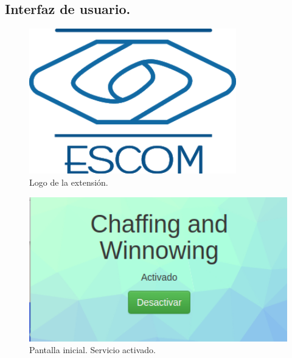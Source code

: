 \documentclass[12pt, a4paper, titlepage]{report}
\begin{document}
			    
			\subsection{Interfaz de usuario.}
			    
			    \begin{figure}[H]
					\begin{center}	\includegraphics[width=9cm]{./imagenes/Desarrollo/Prototipo_1/escom.png}
						\caption{Logo de la extensión.}
					\end{center}
				\end{figure}
			  
			    \begin{figure}[H]
					\begin{center}	\includegraphics[width=13cm]{./imagenes/Desarrollo/Prototipo_1/UI_activado.png}
						\caption{Pantalla inicial. Servicio activado.}
					\end{center}
				\end{figure}
				\label{UI_ACTIVADO_4.7}
				
\end{document}
